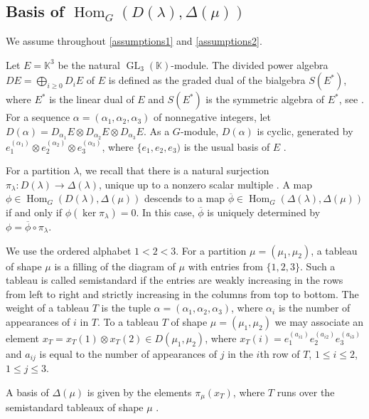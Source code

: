 \documentclass[11pt]{amsart}
\theoremstyle{remark}
\theoremstyle{definition}
\newcommand{\Hom}{\operatorname{Hom}}
\newcommand{\GL}{\operatorname{GL}}
\newcommand{\D}{\Delta}
\newcommand{\la}{\lambda}
\newcommand{\K}{\mathbb K}
\numberwithin{equation}{section}
\begin{document}
	\subsection{Basis of $\Hom_G(D(\la),\D(\mu))$}\label{secbasis}We assume throughout \eqref{assumptions1} and \eqref{assumptions2}.

	Let $E=\K^3$ be the natural $\GL_3(\K)$-module. The divided power algebra $DE = \bigoplus_{i\ge0}D_iE$ of $E$ is defined
as the graded dual of the bialgebra $S(E^*)$, where $E^*$ is
the linear dual of $E$ and $S(E^*)$ is the symmetric algebra
of $E^*$, see \cite[Section 1.1]{W}. For a sequence $\alpha=(\alpha_1, \alpha_2, \alpha_3)$ of nonnegative integers, let $D(\alpha)= D_{\alpha_1}E \otimes D_{\alpha_2}E \otimes D_{\alpha_3}E$. As a $G$-module, $D(\alpha)$ is cyclic, generated by $e_1^{(\alpha_1)}\otimes e_2^{(\alpha_2)} \otimes e_3^{(\alpha_3)}$, where $\{e_1,e_2,e_3)$ is the usual basis of $E$ \cite[isomorphism (8.3.17)]{Kr}.

For a partition $\la$, we recall that there is a natural surjection $\pi_\la:D(\la)\to\Delta(\la)$, unique up to a nonzero scalar multiple \cite[Proposition 2.1.15(a)]{W}. A map $\phi\in\Hom_G(D(\la),\Delta(\mu))$ descends to a map $\overline{\phi}\in\Hom_G(\Delta(\la),\Delta(\mu))$ if and only if $\phi(\ker\pi_\la)=0$. In this case, $\overline{\phi}$ is uniquely determined by $\phi=\overline{\phi}\circ\pi_\la$.

We use the ordered alphabet $1<2<3$. For a partition $\mu=(\mu_1,\mu_2)$, a tableau of shape $\mu$ is a filling of the diagram of $\mu$ with entries from $\{1,2,3\}$. Such a tableau is called semistandard if the entries are weakly increasing in the rows from left to right and strictly increasing in the columns from top to bottom. The weight of a tableau $T$ is the tuple $\alpha=(\alpha_1,\alpha_2,\alpha_3)$, where $\alpha_i$ is the number of appearances of $i$ in $T$. To a tableau $T$ of shape $\mu=(\mu_1, \mu_2)$ we may associate an element $x_T=x_T(1) \otimes x_T(2) \in D(\mu_1,\mu_2)$, where $x_T(i)=e_1^{(a_{i1})}e_2^{(a_{i2})}e_3^{(a_{i3})}$ and $a_{ij}$ is equal to the number of appearances of $j$ in the $i$th row of $T$, $1\le i\le2$, $1\le j\le3$.

A basis of $\D(\mu)$ is given by the elements $\pi_{\mu}(x_T)$, where $T$ runs over the semistandard tableaux of shape $\mu$ \cite[Proposition 2.1.15(b)]{W}.
\end{document}
